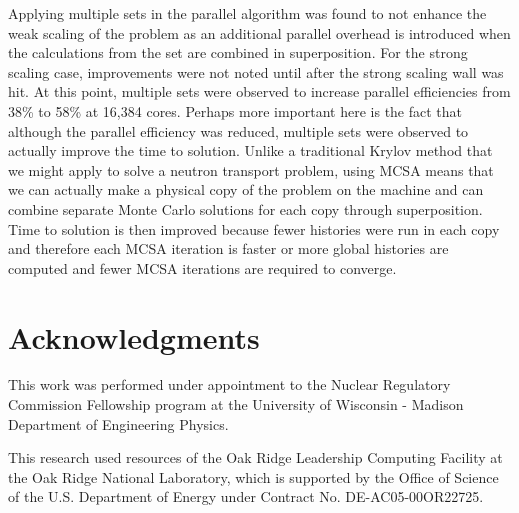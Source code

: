 \documentclass{snamc2013}
\begin{document}
Applying multiple sets in the parallel algorithm was found to not
enhance the weak scaling of the problem as an additional parallel
overhead is introduced when the calculations from the set are combined
in superposition. For the strong scaling case, improvements were not
noted until after the strong scaling wall was hit. At this point,
multiple sets were observed to increase parallel efficiencies from
38\% to 58\% at 16,384 cores. Perhaps more important here is the fact
that although the parallel efficiency was reduced, multiple sets were
observed to actually improve the time to solution. Unlike a
traditional Krylov method that we might apply to solve a neutron
transport problem, using MCSA means that we can actually make a
physical copy of the problem on the machine and can combine separate
Monte Carlo solutions for each copy through superposition. Time to
solution is then improved because fewer histories were run in each
copy and therefore each MCSA iteration is faster or more global
histories are computed and fewer MCSA iterations are required to
converge.

\section*{Acknowledgments}

This work was performed under appointment to the Nuclear Regulatory
Commission Fellowship program at the University of Wisconsin - Madison
Department of Engineering Physics.

This research used resources of the Oak Ridge Leadership Computing
Facility at the Oak Ridge National Laboratory, which is supported by
the Office of Science of the U.S. Department of Energy under Contract
No. DE-AC05-00OR22725.



\end{document}
